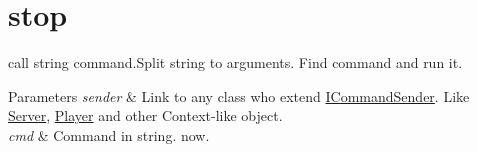 \hypertarget{stop-example}{\section{stop}
}
call string command.\-Split string to arguments. Find command and run it.


\begin{DoxyParams}{Parameters}
{\em sender} & Link to any class who extend \hyperlink{class_i_command_sender}{I\-Command\-Sender}. Like \hyperlink{class_server}{Server}, \hyperlink{class_player}{Player} and other Context-\/like object. \\
\hline
{\em cmd} & Command in string. now.\\
\hline
\end{DoxyParams}

\begin{DoxyCodeInclude}
\end{DoxyCodeInclude}
 